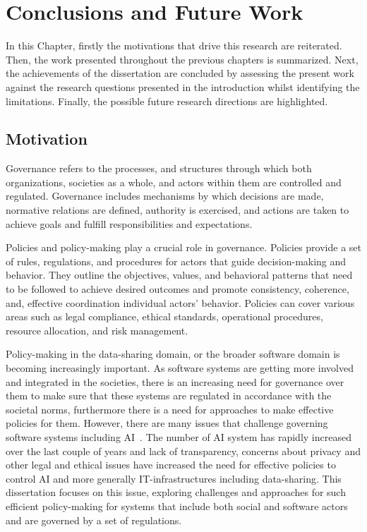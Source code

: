 \chapter{Conclusions and Future Work}


In this Chapter, firstly the motivations that drive this research are reiterated. Then, the work presented throughout the previous chapters is summarized. Next, the achievements of the dissertation are concluded by assessing the present work against the research questions presented in the introduction whilst identifying the limitations. Finally, the possible future research directions are highlighted.

\section{Motivation}
Governance refers to the processes, and structures through which both organizations, societies as a whole, and actors within them are controlled and regulated. Governance includes mechanisms by which decisions are made, normative relations are defined, authority is exercised, and actions are taken to achieve goals and fulfill responsibilities and expectations.

Policies and policy-making play a crucial role in governance. Policies provide a set of rules, regulations, and procedures for actors that guide decision-making and behavior. They outline the objectives, values, and behavioral patterns that need to be followed to achieve desired outcomes and promote consistency, coherence, and, effective coordination individual actors' behavior. Policies can cover various areas such as legal compliance, ethical standards, operational procedures, resource allocation, and risk management.

Policy-making in the data-sharing domain, or the broader software domain is becoming increasingly important. As software systems are getting more involved and integrated in the societies, there is an increasing need for governance over them to make sure that these systems are regulated in accordance with the societal norms,  furthermore there is a need for approaches to make effective policies for them. However, there are many issues that challenge governing software systems including AI~\cite{}. The number of AI system has rapidly increased over the last couple of years and lack of transparency, concerns about privacy and other legal and ethical issues have increased the need for effective policies to control AI and more generally IT-infrastructures including data-sharing.
This dissertation focuses on this issue, exploring challenges and approaches for such efficient policy-making for systems that include both social and software actors and are governed by a set of regulations.

